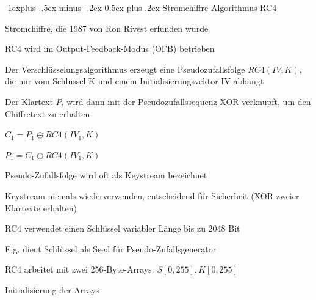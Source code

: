 \documentclass[a4paper]{article}
\makeatletter
\renewcommand{\subsection}{\@startsection{subsection}{2}{0mm}%
 {-1explus -.5ex minus -.2ex}%
 {0.5ex plus .2ex}%
 {\normalfont\normalsize\bfseries}}
\makeatother
\begin{document}
\begin{multicols}{3}
      \subsection{Stromchiffre-Algorithmus RC4}
      \begin{itemize*}
            \item Stromchiffre, die 1987 von Ron Rivest erfunden wurde
            \item RC4 wird im Output-Feedback-Modus (OFB) betrieben
            \begin{itemize*}
                  \item Der Verschlüsselungsalgorithmus erzeugt eine Pseudozufallsfolge $RC4(IV,K)$, die nur vom Schlüssel K und einem Initialisierungsvektor IV abhängt
                  \item Der Klartext $P_i$ wird dann mit der Pseudozufallssequenz XOR-verknüpft, um den Chiffretext zu erhalten %
                  \item $C_1 = P_1\oplus RC4 (IV_1,K)$
                  \item $P_1 = C_1\oplus RC4 (IV_1,K)$
            \end{itemize*}
            \item Pseudo-Zufallsfolge wird oft als Keystream bezeichnet
            \item Keystream niemals wiederverwenden, entscheidend für Sicherheit (XOR zweier Klartexte erhalten)
            \item RC4 verwendet einen Schlüssel variabler Länge bis zu 2048 Bit
            \item Eig. dient Schlüssel als Seed für Pseudo-Zufallsgenerator
            \item RC4 arbeitet mit zwei 256-Byte-Arrays: $S[0,255], K[0,255]$
            \begin{enumerate*}
                  \item Initialisierung der Arrays

\end{enumerate*}
\end{itemize*}
\end{multicols}
\end{document}
